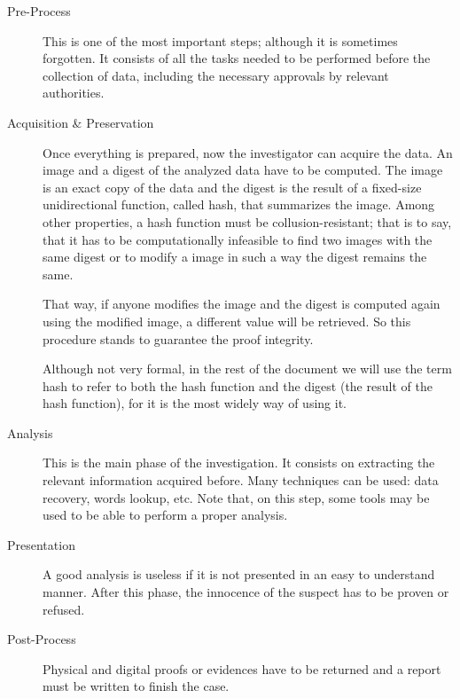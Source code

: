 \begin{description}
	\item [Pre-Process]
		This is one of the most important steps; although it is sometimes 
		forgotten. It consists of all the tasks needed to be performed
		before the collection of data, including the necessary approvals 
		by relevant authorities.

	\item [Acquisition \& Preservation]
		Once everything is prepared, now the investigator can acquire 
		the data. An image and a digest of the analyzed data have to be
		computed. The image is an exact copy of the data and the digest is the
		result of a fixed-size unidirectional function, called hash, 
		that summarizes the image. Among other properties, a hash function must
		be collusion-resistant; that is to say, that it has to be
		computationally infeasible to find two images with the same digest or
		to modify a image in such a way the digest remains the same.

		That way, if anyone modifies the image and the digest is computed
		again using the modified image, a different value will be 
		retrieved. So this procedure stands to guarantee the proof 
		integrity.
		
		Although not very formal, in the rest of the document we will use the
		term hash to refer to both the hash function and the digest (the result
		of the hash function), for it is the most widely way of using it.

	\item [Analysis]
		This is the main phase of the investigation. It consists on extracting
		the relevant information acquired before. Many techniques can be 
		used: data recovery, words lookup, etc. Note that, on this step,
		some tools may be used to be able to perform a proper analysis.

	\item [Presentation]
		A good analysis is useless if it is not presented in an easy to 
		understand manner. After this phase, the innocence of the
		suspect has to be proven or refused.

	\item [Post-Process]
		Physical and digital proofs or evidences have to be returned and a
		report must be written to finish the case.

\end{description}


